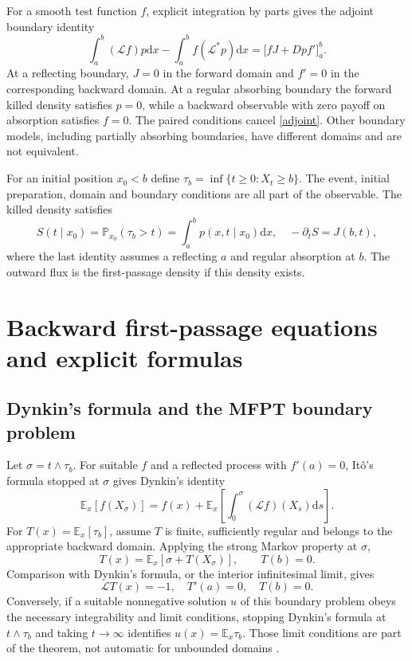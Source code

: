 \documentclass[11pt,a4paper]{article}
\newcommand{\dd}{\mathrm d}
\newcommand{\E}{\mathbb E}
\newcommand{\Pp}{\mathbb P}
\newcommand{\Lop}{\mathcal L}
\theoremstyle{remark}\newtheorem*{remark}{Physical interpretation}
\begin{document}
For a smooth test function $f$, explicit integration by parts gives the adjoint boundary identity
\begin{equation}\label{adjoint}\int_a^b(\Lop f)p\dd x-\int_a^b f(\Lop^*p)\dd x=\big[fJ+Dp f'\big]_a^b.\end{equation}
At a reflecting boundary, $J=0$ in the forward domain and $f'=0$ in the corresponding backward domain. At a regular absorbing boundary the forward killed density satisfies $p=0$, while a backward observable with zero payoff on absorption satisfies $f=0$. The paired conditions cancel \eqref{adjoint}. Other boundary models, including partially absorbing boundaries, have different domains and are not equivalent.

For an initial position $x_0<b$ define $\tau_b=\inf\{t\geq0:X_t\geq b\}$. The event, initial preparation, domain and boundary conditions are all part of the observable. The killed density satisfies
\begin{equation}S(t\mid x_0)=\Pp_{x_0}(\tau_b>t)=\int_a^b p(x,t\mid x_0)\dd x,\quad
-\partial_t S=J(b,t),\end{equation}
where the last identity assumes a reflecting $a$ and regular absorption at $b$. The outward flux is the first-passage density if this density exists.

\section{Backward first-passage equations and explicit formulas}
\subsection{Dynkin's formula and the MFPT boundary problem}
Let $\sigma=t\wedge\tau_b$. For suitable $f$ and a reflected process with $f'(a)=0$, It\^o's formula stopped at $\sigma$ gives Dynkin's identity
\begin{equation}\E_x[f(X_\sigma)]=f(x)+\E_x\left[\int_0^\sigma(\Lop f)(X_s)\dd s\right].\end{equation}
For $T(x)=\E_x[\tau_b]$, assume $T$ is finite, sufficiently regular and belongs to the appropriate backward domain. Applying the strong Markov property at $\sigma$,
\begin{equation}T(x)=\E_x[\sigma+T(X_\sigma)],\qquad T(b)=0.\end{equation}
Comparison with Dynkin's formula, or the interior infinitesimal limit, gives
\begin{equation}\label{mfptbvp}\boxed{\Lop T(x)=-1,\quad T'(a)=0,\quad T(b)=0.}\end{equation}
Conversely, if a suitable nonnegative solution $u$ of this boundary problem obeys the necessary integrability and limit conditions, stopping Dynkin's formula at $t\wedge\tau_b$ and taking $t\to\infty$ identifies $u(x)=\E_x\tau_b$. Those limit conditions are part of the theorem, not automatic for unbounded domains \cite{redner,vankampen}.
\end{document}

